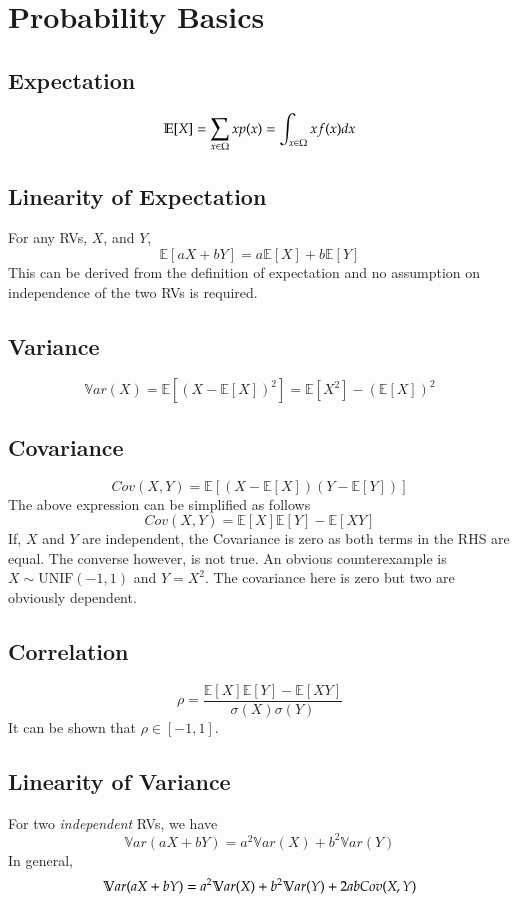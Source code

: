 
\section{Probability Basics}

\subsection{Expectation}
\[\mathbb{E}[X] = \sum_{x \space \in \space \Omega}^{} x p(x) = \int_{x \space \in \space \Omega}^{} x f(x) dx\]

\subsection{Linearity of Expectation}
For any RVs, $X$, and $Y$,
\[\mathbb{E}[aX + bY] = a \mathbb{E}[X] + b \mathbb{E}[Y]\]
This can be derived from the definition of expectation and no assumption on independence of the two RVs is required.

\subsection{Variance}
\[\mathbb{V}ar(X) = \mathbb{E}[\left(X - \mathbb{E}[X]\right)^2] = \mathbb{E}[X^2]  - \left(\mathbb{E}[X]\right)^2\]

\subsection{Covariance}
\[Cov(X,Y) = \mathbb{E}\left[(X - \mathbb{E}[X])(Y - \mathbb{E}[Y]) \right]\]
The above expression can be simplified as follows
\[Cov(X,Y) = \mathbb{E}[X] \mathbb{E}[Y] - \mathbb{E}[XY]\]
If, $X$ and $Y$ are independent, the Covariance is zero as both terms in the RHS are equal. The converse however, is not true. An obvious counterexample is $X \sim \text{UNIF}(-1,1)$ and $Y = X^2$. The covariance here is zero but two are obviously dependent.

\subsection{Correlation}
\[\rho = \frac{\mathbb{E}[X] \mathbb{E}[Y] - \mathbb{E}[XY]}{\sigma (X) \sigma (Y)}\]
It can be shown that $\rho \in [-1,1]$.

\subsection{Linearity of Variance}
For two \textit{independent} RVs, we have 
\[\mathbb{V}ar(aX + bY) = a^2 \mathbb{V}ar(X) + b^2 \mathbb{V}ar(Y)\]
In general,
\[\mathbb{V}ar(aX + bY) = a^2 \mathbb{V}ar(X) + b^2 \mathbb{V}ar(Y) + 2ab \space Cov(X,Y)\]

